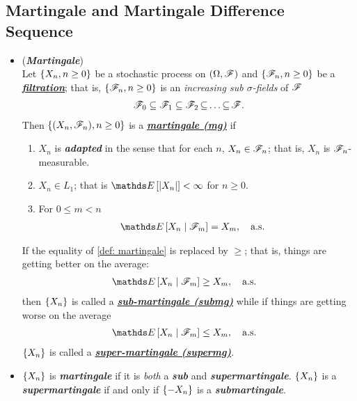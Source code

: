 \documentclass[11pt]{article}
\begin{document}
\subsection{Martingale and Martingale Difference Sequence}
\begin{itemize}
\item \begin{definition} (\emph{\textbf{Martingale}}) \citep{resnick2013probability}\\
Let $\left\{X_n, n \ge 0\right\}$ be a stochastic process on $(\Omega, {\mathscr F})$ and $\left\{{\mathscr F}_n, n \ge 0\right\}$ be a \underline{\textbf{\emph{filtration}}}; that is, $\left\{{\mathscr F}_n, n \ge 0\right\}$ is an \emph{increasing sub $\sigma$-fields} of ${\mathscr F}$
\begin{align*}
{\mathscr F}_0 \subseteq {\mathscr F}_1 \subseteq {\mathscr F}_2 \,{\subseteq}\ldots{\subseteq}\, {\mathscr F}.
\end{align*} Then $\left\{ (X_n, {\mathscr F}_n),  n \ge 0\right\}$ is a \underline{\emph{\textbf{martingale (mg)}}} if
\begin{enumerate}
\item  $X_n$ is \emph{\textbf{adapted}} in the sense that for each $n$, $X_n \in {\mathscr F}_n$; that is, $X_n$ is ${\mathscr F}_n$-measurable.
\item  $X_n \in L_1$; that is $\E{}{\abs{X_n}} < \infty$ for $n \ge 0$.
\item For $0 \le m < n$
\begin{align}
\E{}{X_n \;|\; \srF_m} &= X_m, \quad \text{a.s.} \label{def: martingale}
\end{align}
\end{enumerate}
If the equality of \eqref{def: martingale} is replaced by $\ge$; that is, things are getting better on the average:
\begin{align}
\E{}{X_n \;|\; \srF_m} &\ge X_m, \quad \text{a.s.} \label{def: sub_martingale}
\end{align} then $\left\{X_n\right\}$ is called a \underline{\emph{\textbf{sub-martingale (submg)}}} while if things are getting worse on
the average
\begin{align}
\E{}{X_n \;|\; \srF_m} &\le X_m, \quad \text{a.s.} \label{def: sup_martingale}
\end{align}  $\left\{X_n\right\}$ is called a \underline{\emph{\textbf{super-martingale (supermg)}}}.
\end{definition}

\item \begin{remark}
$\left\{X_n\right\}$ is \emph{\textbf{martingale}} if it is \emph{both} a \emph{\textbf{sub}} and \emph{\textbf{supermartingale}}. $\left\{X_n\right\}$ is a \emph{\textbf{supermartingale}} if and only if $\left\{-X_n\right\}$ is a \emph{\textbf{submartingale}}.
\end{remark}


\end{itemize}
\end{document}
